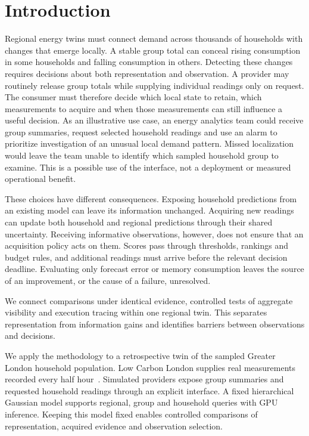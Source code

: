 \documentclass[conference]{IEEEtran}
\begin{document}
\section{Introduction}
Regional energy twins must connect demand across thousands of households with changes that emerge locally. A stable group total can conceal rising consumption in some households and falling consumption in others. Detecting these changes requires decisions about both representation and observation. A provider may routinely release group totals while supplying individual readings only on request. The consumer must therefore decide which local state to retain, which measurements to acquire and when those measurements can still influence a useful decision. As an illustrative use case, an energy analytics team could receive group summaries, request selected household readings and use an alarm to prioritize investigation of an unusual local demand pattern. Missed localization would leave the team unable to identify which sampled household group to examine. This is a possible use of the interface, not a deployment or measured operational benefit.

These choices have different consequences. Exposing household predictions from an existing model can leave its information unchanged. Acquiring new readings can update both household and regional predictions through their shared uncertainty. Receiving informative observations, however, does not ensure that an acquisition policy acts on them. Scores pass through thresholds, rankings and budget rules, and additional readings must arrive before the relevant decision deadline. Evaluating only forecast error or memory consumption leaves the source of an improvement, or the cause of a failure, unresolved.

We connect comparisons under identical evidence, controlled tests of aggregate visibility and execution tracing within one regional twin. This separates representation from information gains and identifies barriers between observations and decisions.

We apply the methodology to a retrospective twin of the sampled Greater London household population. Low Carbon London supplies real measurements recorded every half hour~\cite{london}. Simulated providers expose group summaries and requested household readings through an explicit interface. A fixed hierarchical Gaussian model supports regional, group and household queries with GPU inference. Keeping this model fixed enables controlled comparisons of representation, acquired evidence and observation selection.
\end{document}
